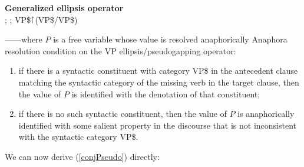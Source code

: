 \documentclass[output=paper,colorlinks,citecolor=brown]{langscibook}
\begin{document}
\begin{exe}
 \ex\label{generalized}
  \textbf{Generalized ellipsis operator} \\
  ; ; VP\$\ensuremath{\vs}(VP\$/VP\$)

  ------where $P$ is a free variable whose value is
  resolved anaphorically
 \ex\label{Acondition}
  Anaphora resolution condition on the VP ellipsis/pseudogapping
  operator:
  \begin{enumerate}
   \item
    if there is a syntactic  constituent
    with category VP\$ in the antecedent clause matching the
    syntactic  category of the missing verb in the target clause,
    then the value of $P$ is identified with the denotation of that constituent;
   \item
    if there is no such syntactic  constituent, then the value of $P$  is anaphorically
    identified with some salient property in the discourse that is not
    inconsistent with the syntactic  category VP\$.
  \end{enumerate}
\end{exe}
We can now derive (\ref{conjPseudo}) directly:
\end{document}
